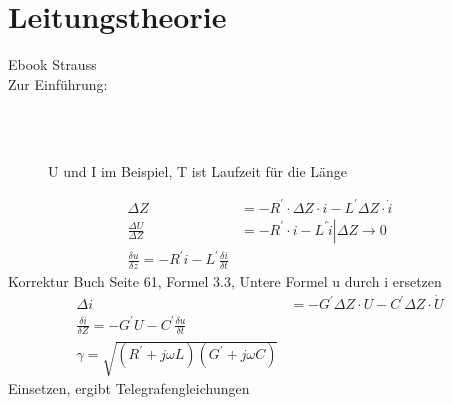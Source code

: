\section{Leitungstheorie}
Ebook Strauss\\
Zur Einführung:\\
\begin{figure}[!h]
\centering
\subfloat[Schema]{
	
	\label{fig:leitungstheorie:bsp1:schema}}\\
\subfloat[Spannung U]{
	
	\label{fig:leitungstheorie:bsp1:u}
}
\qquad
\subfloat[Strom I]{
	
	\label{fig:leitungstheorie:bsp1:i}
}\\
\caption{U und I im Beispiel, T ist Laufzeit für die Länge}
\label{fig:leitungstheorie:bsp}
\end{figure}
\begin{align}
	\Delta Z &= -R^\prime\cdot\Delta Z \cdot i - L^\prime\Delta Z
	\cdot \dot i\nonumber\\
	\frac{\Delta U}{\Delta Z} &= \left. -R^\prime\cdot i - L^\prime\dot i \right|
	\Delta Z \rightarrow 0\nonumber\\
	\boxed{\frac{\delta u}{\delta z}=-R^\prime i- L^\prime \frac{\delta i}{\delta
	t}}\label{leitungstheorie:wellengleichung1}
\end{align}
Korrektur Buch Seite 61, Formel 3.3, Untere Formel u durch i ersetzen\\
\begin{align}
	\Delta i &= -G^\prime \Delta Z \cdot U - C^\prime \Delta Z \cdot \dot
	U\nonumber\\
	\boxed{\frac{\delta i}{\delta Z}=-G^\prime U - C^\prime \frac{\delta u}{\delta
	t}}\label{leitungstheorie:wellengleichung2}\\
	\gamma = \sqrt{\left(R^\prime+j\omega L\right)\left(G^\prime+j\omega
	C\right)}\nonumber
\end{align}
Einsetzen, ergibt Telegrafengleichungen\\
